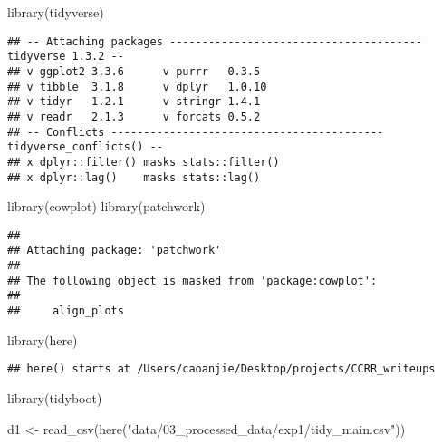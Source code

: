 \documentclass[
]{article}
\author{}
\date{\vspace{-2.5em}}
\newenvironment{Shaded}{\begin{snugshade}}{\end{snugshade}}
\newcommand{\FunctionTok}[1]{\textcolor[rgb]{0.00,0.00,0.00}{#1}}
\newcommand{\NormalTok}[1]{#1}
\newcommand{\OtherTok}[1]{\textcolor[rgb]{0.56,0.35,0.01}{#1}}
\newcommand{\StringTok}[1]{\textcolor[rgb]{0.31,0.60,0.02}{#1}}
\begin{document}
\begin{Shaded}
\begin{Highlighting}[]
\FunctionTok{library}\NormalTok{(tidyverse)}
\end{Highlighting}
\end{Shaded}

\begin{verbatim}
## -- Attaching packages --------------------------------------- tidyverse 1.3.2 --
## v ggplot2 3.3.6      v purrr   0.3.5 
## v tibble  3.1.8      v dplyr   1.0.10
## v tidyr   1.2.1      v stringr 1.4.1 
## v readr   2.1.3      v forcats 0.5.2 
## -- Conflicts ------------------------------------------ tidyverse_conflicts() --
## x dplyr::filter() masks stats::filter()
## x dplyr::lag()    masks stats::lag()
\end{verbatim}

\begin{Shaded}
\begin{Highlighting}[]
\FunctionTok{library}\NormalTok{(cowplot)}
\FunctionTok{library}\NormalTok{(patchwork)}
\end{Highlighting}
\end{Shaded}

\begin{verbatim}
## 
## Attaching package: 'patchwork'
## 
## The following object is masked from 'package:cowplot':
## 
##     align_plots
\end{verbatim}

\begin{Shaded}
\begin{Highlighting}[]
\FunctionTok{library}\NormalTok{(here)}
\end{Highlighting}
\end{Shaded}

\begin{verbatim}
## here() starts at /Users/caoanjie/Desktop/projects/CCRR_writeups
\end{verbatim}

\begin{Shaded}
\begin{Highlighting}[]
 \FunctionTok{library}\NormalTok{(tidyboot)}
\end{Highlighting}
\end{Shaded}

\begin{Shaded}
\begin{Highlighting}[]
\NormalTok{d1 }\OtherTok{\textless{}{-}} \FunctionTok{read\_csv}\NormalTok{(}\FunctionTok{here}\NormalTok{(}\StringTok{"data/03\_processed\_data/exp1/tidy\_main.csv"}\NormalTok{))}
\end{Highlighting}
\end{Shaded}
\end{document}
